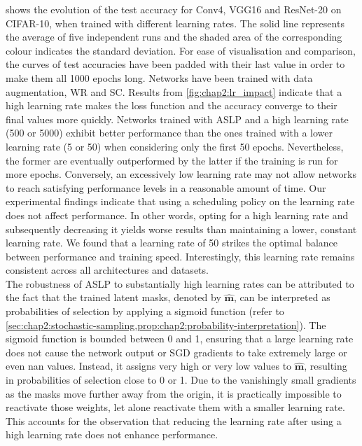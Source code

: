  shows the evolution of the test accuracy for Conv4,
VGG16 and ResNet-20 on CIFAR-10, when trained with different learning rates. The
solid line represents the average of five independent runs and the shaded area
of the corresponding colour indicates the standard deviation. For ease of
visualisation and comparison, the curves of test accuracies have been padded
with their last value in order to make them all 1000 epochs long. Networks have
been trained with data augmentation, \ac{WR} and \ac{SC}. Results from
\cref{fig:chap2:lr_impact} indicate that a high learning rate makes the loss
function and the accuracy converge to their final values more quickly. Networks
trained with \ac{ASLP} and a high learning rate (500 or 5000) exhibit better
performance than the ones trained with a lower learning rate (5 or 50) when
considering only the first 50 epochs. Nevertheless, the former are eventually
outperformed by the latter if the training is run for more epochs. Conversely,
an excessively low learning rate may not allow networks to reach satisfying
performance levels in a reasonable amount of time. Our experimental findings
indicate that using a scheduling policy on the learning rate does not affect
performance. In other words, opting for a high learning rate and subsequently
decreasing it yields worse results than maintaining a lower, constant learning
rate. We found that a learning rate of 50 strikes the optimal balance between
performance and training speed. Interestingly, this learning rate remains
consistent across all architectures and datasets.\\

The robustness of \ac{ASLP} to substantially high learning rates can be
attributed to the fact that the trained latent masks, denoted by $\bm{\hat{m}}$,
can be interpreted as probabilities of selection by applying a sigmoid function
(refer to
\cref{sec:chap2:stochastic-sampling,prop:chap2:probability-interpretation}). The
sigmoid function is bounded between 0 and 1, ensuring that a large learning rate
does not cause the network output or \ac{SGD} gradients to take extremely large
or even \ac{nan} values. Instead, it assigns very high or very low values to
$\bm{\hat{m}}$, resulting in probabilities of selection close to 0 or 1. Due to
the vanishingly small gradients as the masks move further away from the origin,
it is practically impossible to reactivate those weights, let alone reactivate
them with a smaller learning rate. This accounts for the observation that
reducing the learning rate after using a high learning rate does not enhance
performance.\\

